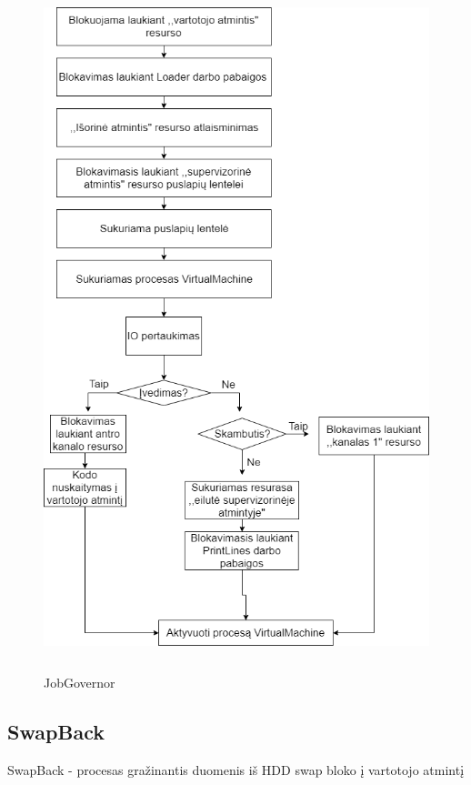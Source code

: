 \documentclass[oneside]{VUMIFPSkursinis}
\begin{document}
\begin{figure}[H]
		\centering	
	\includegraphics[width=18cm,height=20cm,keepaspectratio]{JobGovernor.png}
	\caption{JobGovernor}
	\label{fig:JobGovernor}
\end{figure}

\subsection{SwapBack} SwapBack - procesas gražinantis duomenis iš HDD swap bloko į vartotojo atmintį
 
\end{document}
